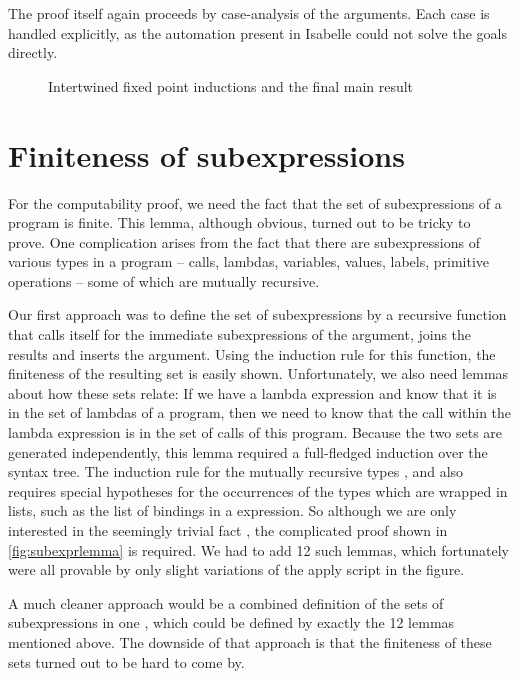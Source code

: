 \documentclass[a4paper,parskip=half,BCOR=8mm,DIV=calc,12pt]{scrbook}
\begin{document}
The proof itself again proceeds by case-analysis of the arguments. Each case is handled explicitly, as the automation present in Isabelle could not solve the goals directly.
 
\begin{figure}
\begin{framed}

\end{framed}
\caption{Intertwined fixed point inductions and the final main result}
\label{fig:intertwined}
\end{figure}

\section{Finiteness of subexpressions}

For the computability proof, we need the fact that the set of subexpressions of a program is finite. This lemma, although obvious, turned out to be tricky to prove. One complication arises from the fact that there are subexpressions of various types in a program – calls, lambdas, variables, values, labels, primitive operations – some of which are mutually recursive.

Our first approach was to define the set of subexpressions by a recursive function that calls itself for the immediate subexpressions of the argument, joins the results and inserts the argument. Using the induction rule for this function, the finiteness of the resulting set is easily shown. Unfortunately, we also need lemmas about how these sets relate: If we have a lambda expression and know that it is in the set of lambdas of a program, then we need to know that the call within the lambda expression is in the set of calls of this program. Because the two sets are generated independently, this lemma required a full-fledged induction over the syntax tree. The induction rule for the mutually recursive types ,  and  also requires special hypotheses for the occurrences of the types which are wrapped in lists, such as the list of bindings in a  expression. So although we are only interested in the seemingly trivial fact , the complicated proof shown in \vref{fig:subexprlemma} is required. We had to add 12 such lemmas, which fortunately were all provable by only slight variations of the apply script in the figure.

A much cleaner approach would be a combined definition of the sets of subexpressions in one , which could be defined by exactly the 12 lemmas mentioned above. The downside of that approach is that the finiteness of these sets turned out to be hard to come by.
\end{document}
